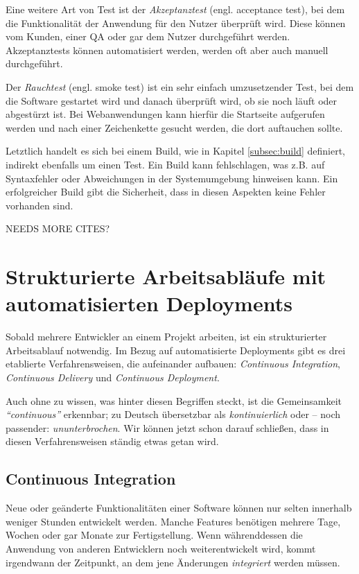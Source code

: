 Eine weitere Art von Test ist der \emph{Akzeptanztest} (engl. acceptance test), bei dem die Funktionalität der Anwendung für den Nutzer überprüft wird. Diese können vom Kunden, einer \ac{QA} oder gar dem Nutzer durchgeführt werden. Akzeptanztests können automatisiert werden, werden oft aber auch manuell durchgeführt.

Der \emph{Rauchtest} (engl. smoke test) ist ein sehr einfach umzusetzender Test, bei dem die Software gestartet wird und danach überprüft wird, ob sie noch läuft oder abgestürzt ist. Bei Webanwendungen kann hierfür die Startseite aufgerufen werden und nach einer Zeichenkette gesucht werden, die dort auftauchen sollte.

Letztlich handelt es sich bei einem Build, wie in Kapitel \ref{subsec:build} definiert, indirekt ebenfalls um einen Test. Ein Build kann fehlschlagen, was z.B. auf Syntaxfehler oder Abweichungen in der Systemumgebung hinweisen kann. Ein erfolgreicher Build gibt die Sicherheit, dass in diesen Aspekten keine Fehler vorhanden sind.

{\draft NEEDS MORE CITES?}

\section{Strukturierte Arbeitsabläufe mit automatisierten Deployments}

Sobald mehrere Entwickler an einem Projekt arbeiten, ist ein strukturierter Arbeitsablauf notwendig. Im Bezug auf automatisierte Deployments gibt es drei etablierte Verfahrensweisen, die aufeinander aufbauen: \emph{Continuous Integration}, \emph{Continuous Delivery} und \emph{Continuous Deployment}.

Auch ohne zu wissen, was hinter diesen Begriffen steckt, ist die Gemeinsamkeit \emph{``continuous''} erkennbar; zu Deutsch übersetzbar als \emph{kontinuierlich} oder – noch passender: \emph{ununterbrochen}. Wir können jetzt schon darauf schließen, dass in diesen Verfahrensweisen ständig etwas getan wird.

\subsection{Continuous Integration}

Neue oder geänderte Funktionalitäten einer Software können nur selten innerhalb weniger Stunden entwickelt werden. Manche Features benötigen mehrere Tage, Wochen oder gar Monate zur Fertigstellung. Wenn während\-dessen die Anwendung von anderen Entwicklern noch weiterentwickelt wird, kommt irgendwann der Zeitpunkt, an dem jene Änderungen \emph{integriert} werden müssen.

